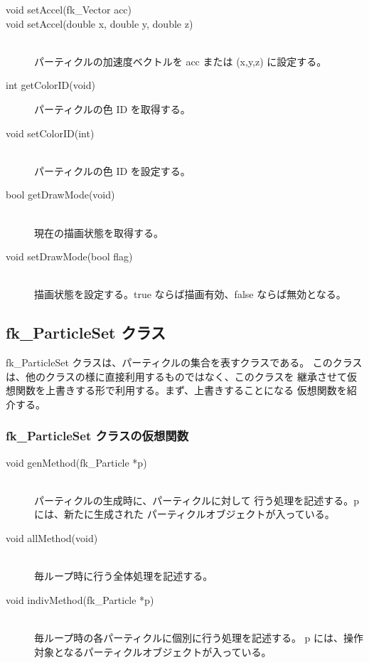 \begin{description}
\item[void setAccel(fk\_Vector acc)]
\item[void setAccel(double x, double y, double z)] ~ \\
	パーティクルの加速度ベクトルを
	acc または (x,y,z) に設定する。\\

\item[int getColorID(void)]
	パーティクルの色 ID を取得する。\\

\item[void setColorID(int)] ~ \\
	パーティクルの色 ID を設定する。\\

\item[bool getDrawMode(void)] ~ \\
	現在の描画状態を取得する。\\

\item[void setDrawMode(bool flag)] ~ \\
	描画状態を設定する。true ならば描画有効、false ならば無効となる。
\end{description}

\subsection{fk\_ParticleSet クラス} 
fk\_ParticleSet クラスは、パーティクルの集合を表すクラスである。
このクラスは、他のクラスの様に直接利用するものではなく、このクラスを
継承させて仮想関数を上書きする形で利用する。まず、上書きすることになる
仮想関数を紹介する。
\subsubsection{fk\_ParticleSet クラスの仮想関数}
\begin{description}
\item[void genMethod(fk\_Particle *p)] ~ \\
	パーティクルの生成時に、パーティクルに対して
	行う処理を記述する。p には、新たに生成された
	パーティクルオブジェクトが入っている。\\

\item[void allMethod(void)] ~ \\
	毎ループ時に行う全体処理を記述する。\\

\item[void indivMethod(fk\_Particle *p)] ~ \\
	毎ループ時の各パーティクルに個別に行う処理を記述する。
	p には、操作対象となるパーティクルオブジェクトが入っている。
\end{description}

